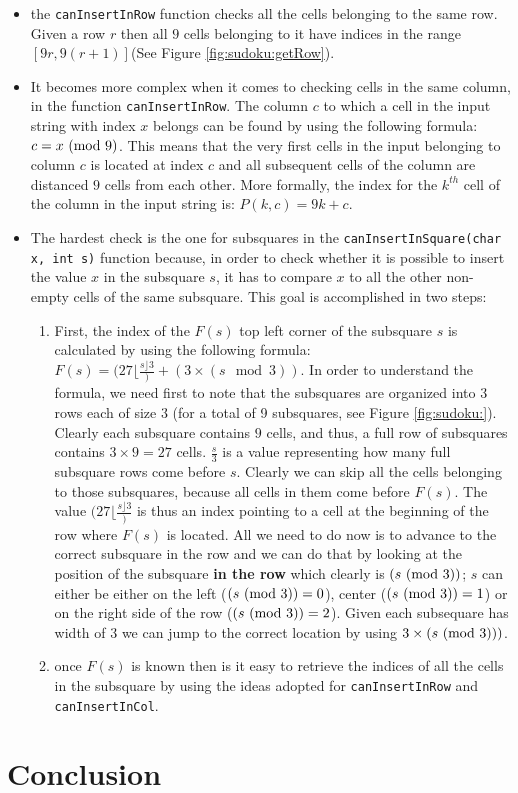 \begin{itemize}
	\item the \lstinline[columns=fixed]{canInsertInRow} function checks all the cells belonging to
	the same row. Given a row $r$ then all $9$ cells belonging to it have indices in the range
	$[9r,9(r+1)]$(See Figure \ref{fig:sudoku:getRow}).
	\item It becomes more complex when it comes to checking cells in the same column, in the
	function \lstinline[columns=fixed]{canInsertInRow}. The column $c$ to which a cell in the input
	string with index $x$ belongs can be found by using the following formula: $c = x \ (\mathrm{mod}\ 9)$. This
	means that the very first cells in the input belonging to column $c$ is located at index $c$ and
	all subsequent cells of the column are distanced $9$ cells from each other. More formally, the
	index for the $k^{th}$ cell of the column in the input string is: $P(k,c) = 9k+c$.
	\item The hardest check is the one for subsquares in the
	\lstinline[columns=fixed]{canInsertInSquare(char x, int s)} function because, in order to check
	whether it is possible to insert the value $x$ in the subsquare $s$,  it has to compare $x$ to all
	the other non-empty cells of the same subsquare. This goal is accomplished in two steps:
	\begin{enumerate}
		\item First, the index of the $F(s)$ top left corner of the subsquare $s$ is calculated  by
		using the following formula: $F(s) = (27 \lfloor \frac{s \rfloor{3}}) + (3\times (s \mod{3}))$.  In
		order to understand the formula, we need first to note that the subsquares are organized
		into $3$ rows each of size $3$ (for a total of 9 subsquares, see Figure \ref{fig:sudoku:}).
		Clearly each subsquare contains $9$ cells, and thus, a full row of subsquares contains
		$3\times9 =27$ cells. $\frac{s}{3}$ is a value representing how many full subsquare rows
		come before $s$. Clearly we can skip all the cells belonging to those subsquares, because
		all cells in them come before $F(s)$. The value $(27 \lfloor \frac{s \rfloor{3}})$ is thus an index
		pointing to a cell at the beginning of the row where $F(s)$ is located. All we need to do
		now is to advance to the correct subsquare in the row and we can do that by looking at the
		position of the subsquare \textbf{in the row} which clearly is $(s \ (\mathrm{mod}\ 3))$; $s$ can either
		be either on the left ($(s \ (\mathrm{mod}\ 3))=0$), center ($(s \ (\mathrm{mod}\ 3))=1$) or on the right side of
		the row ($(s \ (\mathrm{mod}\ 3))=2$). Given each subsequare has width of $3$ we can jump to the
		correct location by using $3\times  (s \ (\mathrm{mod}\ 3)))$. 
		\item once $F(s)$ is known then is it easy to retrieve the indices of all the cells in the
		subsquare by using the ideas adopted for
		\lstinline[columns=fixed]{canInsertInRow} and \lstinline[columns=fixed]{canInsertInCol}.
	\end{enumerate}
	
\end{itemize}





\section{Conclusion}


